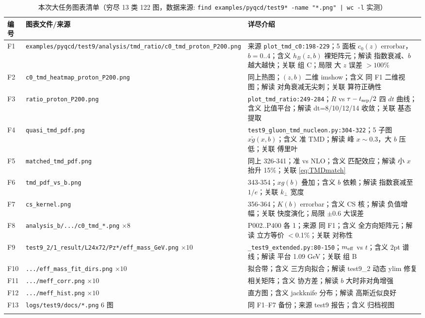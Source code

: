 \documentclass[UTF8]{ctexart}
\begin{document}
\small
\begin{xltabular}{\textwidth}{llX}
\toprule
编号 & 图表文件/来源 & 详尽介绍 \\
\midrule
\endhead
F1 & \texttt{\nolinkurl{examples/pyqcd/test9/analysis/tmd\_ratio/c0\_tmd\_proton\_P200.png}} & 来源 \texttt{\nolinkurl{plot\_tmd\_c0:198-229}}；5 面板 $c_0(z)$ errorbar，$b=0..4$；含义 $h_B(z,b)$ 裸矩阵元；解读 指数衰减、$b$ 越大越快；关联 组 C；局限 大 $z$ 误差 $>100\%$ \\
F2 & \texttt{\nolinkurl{c0\_tmd\_heatmap\_proton\_P200.png}} & 同上热图；$(z,b)$ 二维 imshow；含义 同 F1 二维视图；解读 对角衰减无尖刺；关联 算符正确性 \\
F3 & \texttt{\nolinkurl{ratio\_proton\_P200.png}} & \texttt{\nolinkurl{plot\_tmd\_ratio:249-284}}；$R$ vs $\tau-t_{\rm sep}/2$ 四 $dt$ 曲线；含义 比值平台；解读 dt=8/10/12/14 收敛；关联 基态提取 \\
F4 & \texttt{\nolinkurl{quasi\_tmd\_pdf.png}} & \texttt{\nolinkurl{test9\_gluon\_tmd\_nucleon.py:304-322}}；5 子图 $x\tilde g(x,b)$；含义 准 TMD；解读 峰 $x\sim0.3$，大 $b$ 压低；关联 傅里叶 \\
F5 & \texttt{\nolinkurl{matched\_tmd\_pdf.png}} & 同上 326-341；准 vs NLO；含义 匹配效应；解读 小 $x$ 抬升 15\%；关联 \eqref{eq:TMDmatch} \\
F6 & \texttt{\nolinkurl{tmd\_pdf\_vs\_b.png}} & 343-354；$xg(b)$ 叠加；含义 $b$ 依赖；解读 指数衰减至 $1/e$；关联 $k_\perp$ 宽度 \\
F7 & \texttt{\nolinkurl{cs\_kernel.png}} & 356-364；$K(b)$ errorbar；含义 CS 核；解读 负值增幅；关联 快度演化；局限 $\pm0.6$ 大误差 \\
F8 & \texttt{\nolinkurl{analysis\_b/.../c0\_tmd\_*.png}} $\times8$ & P002..P400 各 1；来源 同 F1；含义 全方向矩阵元；解读 立方等价 $<$0.1\%；关联 对称性 \\
F9 & \texttt{\nolinkurl{test9\_2/1\_result/L24x72/Pz*/eff\_mass\_GeV.png}} $\times10$ & \texttt{\nolinkurl{\_test9\_extended.py:80-150}}；$m_{\rm eff}$ vs $t$；含义 2pt 谱线；解读 平台 1.09 GeV；关联 组 B \\
F10 & \texttt{\nolinkurl{.../eff\_mass\_fit\_dirs.png}} $\times10$ & 拟合带；含义 三方向拟合；解读 test9\_2 动态 ylim 修复 \\
F11 & \texttt{\nolinkurl{.../meff\_corr.png}} $\times10$ & 相关矩阵；含义 协方差；解读 $b$ 大时非对角增强 \\
F12 & \texttt{\nolinkurl{.../meff\_hist.png}} $\times10$ & 直方图；含义 jackknife 分布；解读 高斯近似良好 \\
F13 & \texttt{\nolinkurl{logs/test9/docs/*.png}} 6 图 & 同 F1--F7 备份；来源 test9 报告；含义 归档视图 \\
\bottomrule
\caption{本次大任务图表清单（穷尽 13 类 122 图，数据来源: \texttt{\nolinkurl{find examples/pyqcd/test9* -name "*.png" | wc -l}} 实测）}
\end{xltabular}
\end{document}
